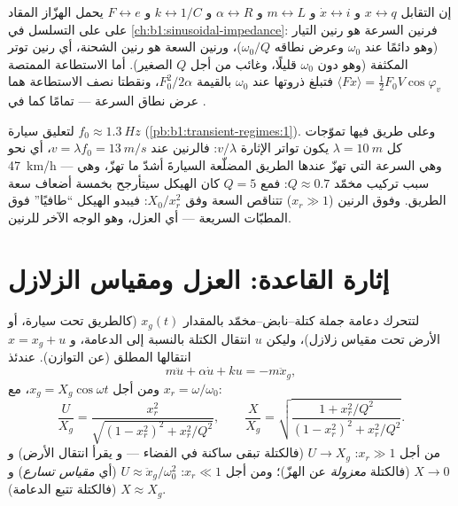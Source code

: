 \begin{remark}\label{rem:b1:oscillators-resonance:analogy}
إن التقابل $x \leftrightarrow q$ و $\dot x \leftrightarrow i$
و $m \leftrightarrow L$ و $\alpha \leftrightarrow R$ و $k \leftrightarrow 1/C$
و $F \leftrightarrow e$ يحمل الهزّاز المقاد على  على التسلسل في
\cref{ch:b1:sinusoidal-impedance}: فرنين السرعة هو رنين
التيار (وهو دائمًا عند $\omega_0$ وعرض نطاقه $\omega_0/Q$)، ورنين السعة
هو رنين الشحنة، أي رنين توتر المكثفة (وهو دون $\omega_0$
قليلًا، وغائب من أجل $Q$ الصغير). أما الاستطاعة الممتصة $\langle F\dot x\rangle
= \tfrac12 F_0V\cos\varphi_v$ فتبلغ ذروتها عند $\omega_0$ بالقيمة $F_0^2/2\alpha$،
ونقطتا نصف الاستطاعة هما عرض نطاق السرعة --- تمامًا كما في
.
\end{remark}

\begin{example}\label{ex:b1:oscillators-resonance:road}
لتعليق سيارة $f_0 \approx \qty{1.3}{Hz}$ (\cref{pb:b1:transient-regimes:1}).
وعلى طريق فيها تموّجات كل $\lambda = \qty{10}{m}$ يكون تواتر
الإثارة $v/\lambda$: فالرنين عند $v = \lambda f_0 = \qty{13}{m/s}$،
أي نحو \qty{47}{km/h} --- وهي السرعة التي تهزّ عندها الطريق المضلّعة
السيارةَ أشدّ ما تهزّ، وهي سبب تركيب مخمّد $Q \approx 0.7$:
فمع $Q = 5$ كان الهيكل سيتأرجح بخمسة أضعاف
سعة الطريق. وفوق الرنين ($x_r \gg 1$) تتناقص السعة وفق
$X_0/x_r^2$: فيبدو الهيكل ``طافيًا'' فوق المطبّات السريعة --- أي العزل،
وهو الوجه الآخر للرنين.
\end{example}

\section{إثارة القاعدة: العزل ومقياس الزلازل}

\begin{proposition}\label{prop:b1:oscillators-resonance:base}
لتتحرك دعامة جملة كتلة--نابض--مخمّد بالمقدار $x_g(t)$ (كالطريق
تحت سيارة، أو الأرض تحت مقياس زلازل)، وليكن $u$ انتقال
الكتلة بالنسبة إلى الدعامة، و $x = x_g + u$ انتقالها
المطلق (عن التوازن). عندئذ
\[
m\ddot u + \alpha\dot u + ku = -m\ddot x_g ,
\]
ومن أجل $x_g = X_g\cos\omega t$، مع $x_r = \omega/\omega_0$:
\[
\frac{U}{X_g} = \frac{x_r^2}{\sqrt{(1 - x_r^2)^2 + x_r^2/Q^2}},
\qquad
\frac{X}{X_g} = \sqrt{\frac{1 + x_r^2/Q^2}{(1 - x_r^2)^2 + x_r^2/Q^2}} .
\]
من أجل $x_r \gg 1$: $U \to X_g$ (فالكتلة تبقى ساكنة في الفضاء --- و\emph{} يقرأ انتقال الأرض) و $X \to 0$ (فالكتلة
\emph{معزولة} عن الهزّ)؛ ومن أجل $x_r \ll 1$: $U \approx
\ddot x_g/\omega_0^2$ (أي \emph{مقياس تسارع}) و $X \approx X_g$ (فالكتلة
تتبع الدعامة).
\end{proposition}

